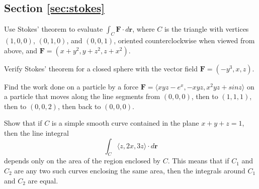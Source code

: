 \documentclass[svgnames]{watsonbook}
\begin{document}
\subsection*{Section \ref{sec:stokes}}

\begin{exercise}{}{}
   Use Stokes' theorem to evaluate $\int_C\mathbf{F} \cdot d\mathbf{r}$, where $C$ is the triangle with vertices $(1,0,0)$, $(0,1,0)$, and $(0,0,1)$, oriented counterclockwise when viewed from above, and $\mathbf{F} = (x+y^2,y+z^2,z+x^2)$. 
\end{exercise}

\begin{exercise}{}{}
  Verify Stokes' theorem for a closed sphere with the vector field
$\mathbf{F} = (-y^3,x,z)$. 
\end{exercise}

\begin{exercise}{}{}
  Find the work done on a particle by a force $\mathbf{F}=\langle
  xyz−e^x, −xyz, x^2yz+sin z \rangle$ on a particle that moves along the line segments from $(0, 0, 0)$, then to $(1, 1, 1)$, then to $(0, 0, 2)$, then back to $(0, 0, 0)$.
\end{exercise}

\begin{exercise}{}{}
Show that if $C$ is a simple smooth curve contained in the plane
$x+y+z = 1$, then the line integral
\[\int_C \langle z, 2x, 3z \rangle \cdot d\mathbf{r}\]
depends only on the area of the region enclosed by $C$. This means
that if $C_1$ and $C_2$ are any two such curves enclosing the same area,
then the integrals around $C_1$ and $C_2$ are equal. 
\end{exercise}
\end{document}
